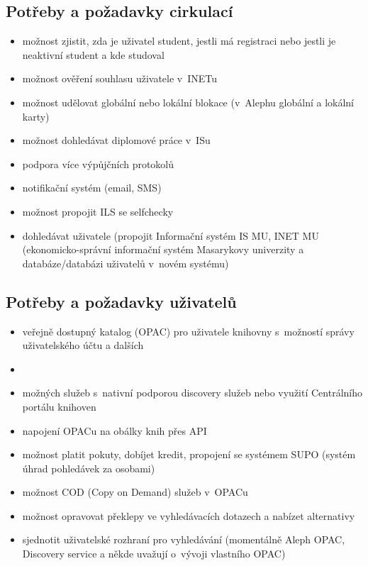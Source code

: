 \documentclass[
	11pt, oneside, printed, draft, 
	table,   %
	lof,     %
	lot     %
]{fithesis3}
\begin{document}
{\subsection{Potřeby a požadavky cirkulací}

\begin{itemize}
\item možnost zjistit, zda je uživatel student, jestli má registraci nebo jestli je neaktivní student a kde studoval
\item možnost ověření souhlasu uživatele v~INETu
\item možnost udělovat globální nebo lokální blokace (v~Alephu globální a lokální karty)
\item možnost dohledávat diplomové práce v~ISu
\item podpora více výpůjčních protokolů
\item notifikační systém (email, SMS)
\item možnost propojit ILS se selfchecky
\item dohledávat uživatele (propojit Informační systém IS MU, INET MU (ekonomicko-správní informační systém Masarykovy univerzity a databáze/databázi uživatelů v~novém systému)
\end{itemize}

\subsection{Potřeby a požadavky uživatelů}

\begin{itemize}
\item veřejně dostupný katalog (OPAC) pro uživatele knihovny s~možností správy uživatelského účtu a dalších \item \item možných služeb s~nativní podporou discovery služeb nebo využití Centrálního portálu knihoven
\item napojení OPACu na obálky knih přes API 
\item možnost platit pokuty, dobíjet kredit, propojení se systémem SUPO (systém úhrad pohledávek za osobami)
\item možnost COD (Copy on Demand) služeb v~OPACu
\item možnost opravovat překlepy ve vyhledávacích dotazech a nabízet alternativy
\item sjednotit uživatelské rozhraní pro vyhledávání (momentálně Aleph OPAC, Discovery service a někde uvažují o~vývoji vlastního OPAC)
\end{itemize}

}
\end{document}

